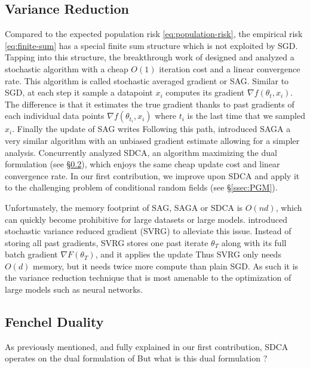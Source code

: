 \subsection{Variance Reduction}
\label{ssec:variance-reduction}
Compared to the expected population risk \cref{eq:population-risk}, the empirical risk \cref{eq:finite-sum} has a special finite sum structure which is not exploited by SGD.
Tapping into this structure, the breakthrough work of \citet{roux2012stochastic} designed and analyzed a stochastic algorithm with a  cheap $O(1)$ iteration cost and a linear convergence rate. 
This algorithm is called stochastic averaged gradient or SAG. 
Similar to SGD, at each step it sample a datapoint $x_i$ computes its gradient $\nabla f(\theta_{t}, x_i)$.
The difference is that it estimates the true gradient thanks to past gradients of each individual data points $\nabla f(\theta_{t_i}, x_i)$ where $t_i$ is the last time that we sampled $x_i$.
Finally the update of SAG writes
Following this path, \citet{defazio2014saga} introduced SAGA a very similar algorithm with an unbiased gradient estimate  allowing for a simpler analysis.
Concurrently \citet{shalev-shwartz_stochastic_2013} analyzed SDCA, an algorithm maximizing the dual formulation (see \S\ref{ssec:fenchel-duality}), which enjoys the same cheap update cost and linear convergence rate.
In our first contribution, we improve upon SDCA and apply it to the challenging problem of conditional random fields (see \S\ref{ssec:PGM}).

Unfortunately, the memory footprint of SAG, SAGA or SDCA is $O(n d)$, which can quickly become prohibitive for large datasets or large models. 
\citet{johnson2013accelerating} introduced stochastic variance reduced gradient (SVRG) to alleviate this issue. 
Instead of storing all past gradients, SVRG stores one past iterate $\theta_T$ along with its full batch gradient $\nabla F(\theta_T)$, and it applies the update
Thus SVRG only needs $O(d)$ memory, but it needs twice more compute than plain SGD. As such it is the variance reduction technique that is most amenable to the optimization of large models such as neural networks.

\subsection{Fenchel Duality}
\label{ssec:fenchel-duality}
As previously mentioned, and fully explained in our first contribution, SDCA operates on the dual formulation of 
But what is this dual formulation ?

